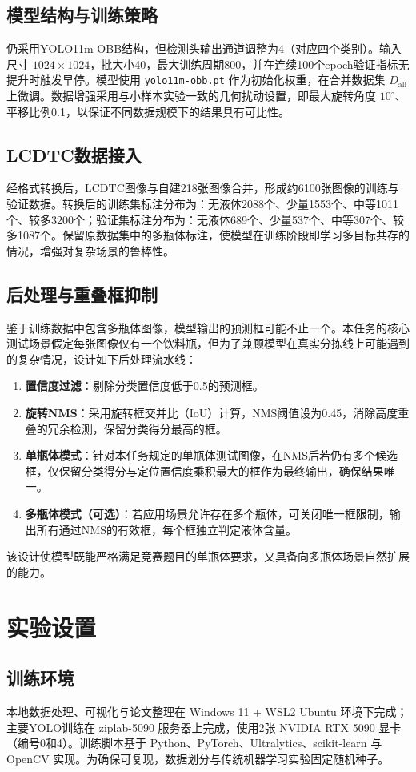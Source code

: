 \documentclass[withoutpreface,bwprint]{cumcmthesis}
\begin{document}
\subsection{模型结构与训练策略}
仍采用YOLO11m-OBB结构，但检测头输出通道调整为4（对应四个类别）。输入尺寸 $1024\times1024$，批大小40，最大训练周期800，并在连续100个epoch验证指标无提升时触发早停。模型使用 \texttt{yolo11m-obb.pt} 作为初始化权重，在合并数据集 $D_{\text{all}}$ 上微调。数据增强采用与小样本实验一致的几何扰动设置，即最大旋转角度 $10^\circ$、平移比例0.1，以保证不同数据规模下的结果具有可比性。

\subsection{LCDTC数据接入}
经格式转换后，LCDTC图像与自建218张图像合并，形成约6100张图像的训练与验证数据。转换后的训练集标注分布为：无液体2088个、少量1553个、中等1011个、较多3200个；验证集标注分布为：无液体689个、少量537个、中等307个、较多1087个。保留原数据集中的多瓶体标注，使模型在训练阶段即学习多目标共存的情况，增强对复杂场景的鲁棒性。

\subsection{后处理与重叠框抑制}
鉴于训练数据中包含多瓶体图像，模型输出的预测框可能不止一个。本任务的核心测试场景假定每张图像仅有一个饮料瓶，但为了兼顾模型在真实分拣线上可能遇到的复杂情况，设计如下后处理流水线：
\begin{enumerate}
    \item \textbf{置信度过滤}：剔除分类置信度低于0.5的预测框。
    \item \textbf{旋转NMS}：采用旋转框交并比（IoU）计算，NMS阈值设为0.45，消除高度重叠的冗余检测，保留分类得分最高的框。
    \item \textbf{单瓶体模式}：针对本任务规定的单瓶体测试图像，在NMS后若仍有多个候选框，仅保留分类得分与定位置信度乘积最大的框作为最终输出，确保结果唯一。
    \item \textbf{多瓶体模式（可选）}：若应用场景允许存在多个瓶体，可关闭唯一框限制，输出所有通过NMS的有效框，每个框独立判定液体含量。
\end{enumerate}
该设计使模型既能严格满足竞赛题目的单瓶体要求，又具备向多瓶体场景自然扩展的能力。

\section{实验设置}
\subsection{训练环境}
本地数据处理、可视化与论文整理在 Windows 11 + WSL2 Ubuntu 环境下完成；主要YOLO训练在 ziplab-5090 服务器上完成，使用2张 NVIDIA RTX 5090 显卡（编号0和4）。训练脚本基于 Python、PyTorch、Ultralytics、scikit-learn 与 OpenCV 实现。为确保可复现，数据划分与传统机器学习实验固定随机种子。
\end{document}
